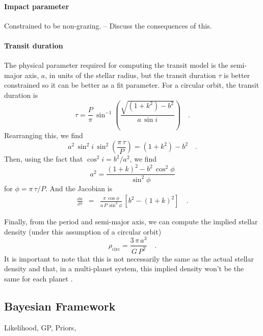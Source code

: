 \documentclass[linenumbers,floatfix,ApJL,twocolumn]{aastex631}
\begin{document}
\paragraph{Impact parameter}
Constrained to be non-grazing. -- Discuss the consequences of this.

\paragraph{Transit duration}
The physical parameter required for computing the transit model is the semi-major axis, $a$, in units of the stellar radius, but the transit duration $\tau$ is better constrained so it can be better as a fit parameter.
For a circular orbit, the transit duration is \citep{Winn:2010}
\begin{equation}
  \tau = \frac{P}{\pi}\,\sin^{-1}\left( \frac{\sqrt{(1 + k^2) - b^2}}{a\,\sin i} \right) \quad.
\end{equation}
Rearranging this, we find
\begin{equation}
  a^2\,\sin^2 i\,\sin^2\left(\frac{\pi\,\tau}{P}\right) = (1 + k^2) - b^2 \quad.
\end{equation}
Then, using the fact that $\cos^2 i = b^2 / a^2$, we find
\begin{equation}
  a^2 = \frac{(1 + k)^2 - b^2\,\cos^2\phi}{\sin^2\phi}
\end{equation}
for $\phi = \pi\,\tau / P$.
And the Jacobian is
\begin{eqnarray}
  \frac{\dd a}{\dd \tau} &=& \frac{\pi\,\cos \phi}{a\,P\,\sin^3 \phi}\,\left[b^2 - (1 + k)^2\right] \quad.
\end{eqnarray}

Finally, from the period and semi-major axis, we can compute the implied stellar density (under this assumption of a circular orbit)
\begin{equation}
  \rho_\mathrm{circ} = \frac{3\,\pi\,a^3}{G\,P^2} \quad.
\end{equation}
It is important to note that this is not necessarily the same as the actual stellar density and that, in a multi-planet system, this implied density won't be the same for each planet \citep[see, for example,][]{Dawson:2012, Kipping:2012}.




\subsection{Bayesian Framework}


Likelihood, GP, Priors, \celerite
\end{document}
